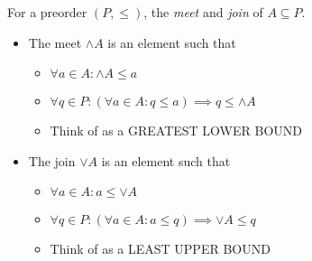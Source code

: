 
For a preorder $(P, \leq)$, the \emph{meet} and \emph{join} of $A \subseteq P$.

\begin{itemize}
    \item The meet $\wedge A$ is an element such that
          \begin{itemize}
            \item $\forall a \in A: \wedge A \leq a$
            \item $\forall q \in P: (\forall a \in A: q \leq a) \implies q \leq \wedge A$
            \item Think of as a GREATEST LOWER BOUND
          \end{itemize}
    \item The join $\vee A$ is an element such that
          \begin{itemize}
            \item $\forall a \in A: a \leq \vee A$
            \item $\forall q \in P: (\forall a \in A: a \leq q) \implies \vee A \leq q$
            \item Think of as a LEAST UPPER BOUND
          \end{itemize}
  \end{itemize}